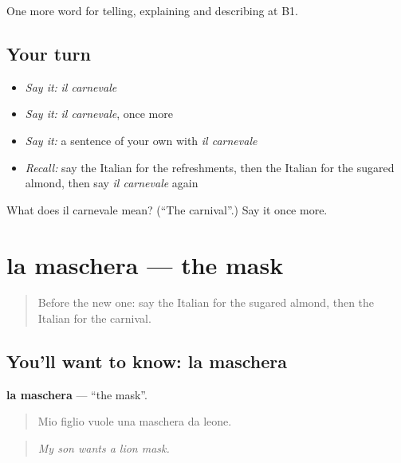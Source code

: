 \begin{grammarlens}[title={What you've built}]
One more word for telling, explaining and describing at B1.
\end{grammarlens}

\subsection*{Your turn}
\begin{itemize}
\raggedright
  \item \emph{Say it:} \emph{il carnevale}
  \item \emph{Say it:} \emph{il carnevale}, once more
  \item \emph{Say it:} a sentence of your own with \emph{il carnevale}
  \item \emph{Recall:} say the Italian for the refreshments, then the Italian for the sugared almond, then say \emph{il carnevale} again
\end{itemize}

\begin{tcolorbox}[breakable,colback=teal!4,colframe=teal!35!black,title={Before you move on}]
What does il carnevale mean? (\textquotedblleft{}The carnival\textquotedblright{}.) Say it once more.
\end{tcolorbox}
\section[la maschera]{la maschera — the mask}

\label{lesson:IT-C319-maschera}



\begin{quote}
Before the new one: say the Italian for the sugared almond, then the Italian for the carnival.
\end{quote}

\subsection*{You'll want to know: la maschera}
\textbf{la maschera} — \textquotedblleft{}the mask\textquotedblright{}.

\begin{quote}
Mio figlio vuole una maschera da leone.
\end{quote}

\begin{quote}
\emph{My son wants a lion mask.}
\end{quote}

